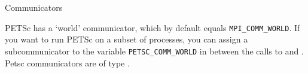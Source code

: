 
 {Communicators}

PETSc has a `world' communicator, which by default equals
\lstinline{MPI_COMM_WORLD}. If you want to run PETSc on a subset of processes,
you can assign a subcommunicator to the variable \lstinline{PETSC_COMM_WORLD}
in between the calls to  and
.
Petsc communicators are of type .

\endinput

\Level 0 {Scalars}

The definition of
\indexpetscdef{PetscInt}, \indexpetscdef{PetscReal}, \indexpetscdef{PetscComplex}
depends on how PETSc was installed.
This makes interoperability with other libraries such as
\emph{MPI}%
a little tricky.

The equivalent \indexpetscshow{MPI_Datatype} values are
\indexpetscdef{PetscMPIInt}
\indexpetscdef{MPIU_INT}
\indexpetscdef{MPIU_REAL}
\indexpetscdef{MPIU_SCALAR}
\indexpetscdef{MPIU_COMPLEX}

Similarly, for the
\emph{BLAS}%
library there  are:
%
\indexpetscdef{PetscBLASInt}

No real types are needed since these are passed by reference.


